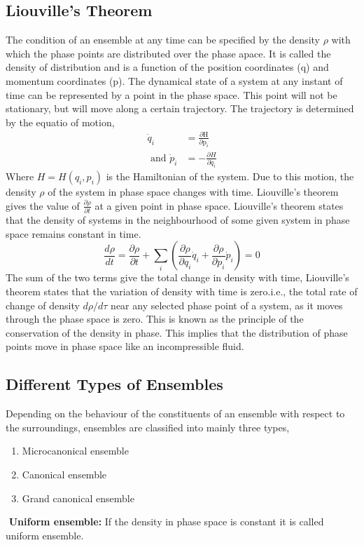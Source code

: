 \subsection{Liouville's Theorem}
The condition of an ensemble at any time can be specified by the density $\rho$ with which the phase points are distributed over the phase apace.  It is called the density of distribution and is a function of the position coordinates (q) and momentum coordinates (p).
The dynamical state of a system at any instant of time can be represented by a point in the phase space.  This point will not be stationary, but will move along a certain trajectory. The trajectory is determined by the equatio of motion,
\begin{align}
\dot{q}_{i}&=\frac{\partial \mathrm{H}}{\partial \mathrm{p}_{i}}\\
\text{ and } \dot{p}_{i}&=-\frac{\partial H}{\partial \dot{q}_{i}}
\end{align}
Where $H=H\left(q_{i}, p_{i}\right)$ is the Hamiltonian of the system. Due to this motion, the density $\rho$ of the system in phase space changes with time.
Liouville's theorem gives the value of $\frac{\partial \rho}{\partial t}$ at a given point in phase space.
Liouville's theorem states that the density of systems in the neighbourhood of some given system in phase space remains constant in time.
\begin{equation}
\frac{d \rho}{d t}=\frac{\partial \rho}{\partial t}+\sum_{i}\left(\frac{\partial \rho}{\partial q_{i}} \dot{q}_{i}+\frac{\partial \rho}{\partial p_{i}} \dot{p}_{i}\right)=0
\end{equation}
The sum of the two terms give the total change in density with time, Liouville's theorem states that the variation of density with time is zero.i.e., the total rate of change of density $d\rho/d\tau$ near any selected phase point of a system, as it moves through the phase space is zero.
This is known as the principle of the conservation of the density in phase.  This implies that the distribution of phase points move in phase space like an incompressible fluid.\\
\subsection{Different Types of Ensembles}
Depending on the behaviour of the constituents of an ensemble with respect to the surroundings, ensembles are classified into mainly three types,
\begin{enumerate}
	\item Microcanonical ensemble
	\item Canonical ensemble
	\item Grand canonical ensemble
\end{enumerate} 
\begin{note}
	$\left. \right. $ \textbf{Uniform ensemble: }If the density in phase space is constant it is called uniform ensemble.
\end{note}

